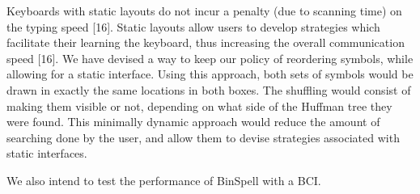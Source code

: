 \documentclass[12pt,titlepage]{article}
\begin{document}
Keyboards with static layouts do not incur a penalty (due to scanning time) on the typing speed [16]. 
Static layouts allow users to develop strategies which facilitate their learning the keyboard, thus 
increasing the overall communication speed [16].  We have devised a way to keep our policy of 
reordering symbols, while allowing for a static interface.  Using this approach, both sets of symbols 
would be drawn in exactly the same locations in both boxes.  The  shuffling would consist of making 
them visible or not, depending on what side of the Huffman tree they were found.  This minimally 
dynamic approach would reduce the amount of searching done by the user, and allow them to devise 
strategies associated with static interfaces. 

We also intend to test the performance of BinSpell with a BCI.



\end{document}
